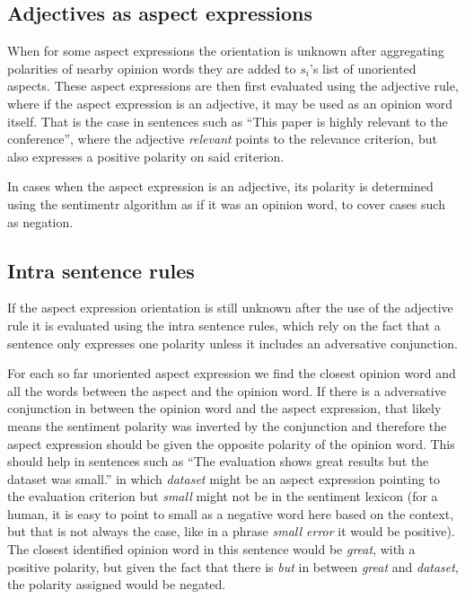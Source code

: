\subsection{Adjectives as aspect expressions}
When for some aspect expressions the orientation is unknown after aggregating polarities of nearby opinion words they are added to $s_{i}$'s list of unoriented aspects. These aspect expressions are then first evaluated using the adjective rule, where if the aspect expression is an adjective, it may be used as an opinion word itself. That is the case in sentences such as ``This paper is highly relevant to the conference'', where the adjective \textit{relevant} points to the relevance criterion, but also expresses a positive polarity on said criterion. 

In cases when the aspect expression is an adjective, its polarity is determined using the sentimentr algorithm as if it was an opinion word, to cover cases such as negation.

\subsection{Intra sentence rules}
If the aspect expression orientation is still unknown after the use of the adjective rule it is evaluated using the intra sentence rules, which rely on the fact that a sentence only expresses one polarity unless it includes an adversative conjunction.

For each so far unoriented aspect expression we find the closest opinion word and all the words between the aspect and the opinion word. If there is a adversative conjunction in between the opinion word and the aspect expression, that likely means the sentiment polarity was inverted by the conjunction and therefore the aspect expression should be given the opposite polarity of the opinion word. This should help in sentences such as ``The evaluation shows great results but the dataset was small.'' in which \textit{dataset} might be an aspect expression pointing to the evaluation criterion but \textit{small} might not be in the sentiment lexicon (for a human, it is easy to point to small as a negative word here based on the context, but that is not always the case, like in a phrase \textit{small error} it would be positive). The closest identified opinion word in this sentence would be \textit{great}, with a positive polarity, but given the fact that there is \textit{but} in between \textit{great} and \textit{dataset}, the polarity assigned would be negated.

